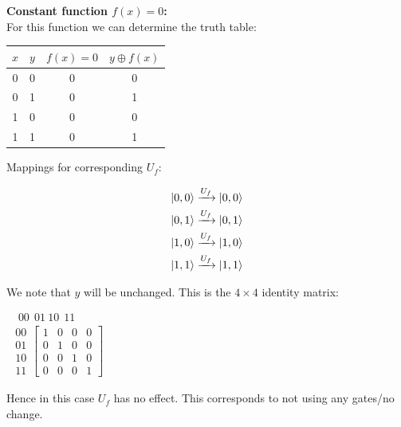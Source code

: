 \documentclass[conference]{IEEEtran}
\begin{document}
\begin{appendices}
\textbf{Constant function $f(x) = 0$:} \\

For this function we can determine the truth table:

\begin{center}
\begin{tabular}{|c|c|c|c|}
    \hline
    $x$ & $y$ & $f(x) = 0$ & $y \oplus f(x)$\\
    \hline
    0 & 0 & 0 & 0 \\
    0 & 1 & 0 & 1 \\
    1 & 0 & 0 & 0 \\
    1 & 1 & 0 & 1 \\
    \hline
\end{tabular}
\end{center}

Mappings for corresponding $U_f$:

\begin{gather*}
    \ket{0, 0} \xrightarrow{U_f} \ket{0, 0} \\
    \ket{0, 1} \xrightarrow{U_f} \ket{0, 1} \\
    \ket{1, 0} \xrightarrow{U_f} \ket{1, 0} \\
    \ket{1, 1} \xrightarrow{U_f} \ket{1, 1} \\
\end{gather*}

We note that $y$ will be unchanged. This is the $4 \times 4$ identity matrix:

\begin{center}
$
\begin{matrix}
    \ \ \ {\scriptstyle 00} \ \ {\scriptstyle 01} \ {\scriptstyle 10} \ \ {\scriptstyle 11}
    \\
    \begin{matrix}
    {\scriptstyle 00} \\
    {\scriptstyle 01} \\
    {\scriptstyle 10} \\
    {\scriptstyle 11}
    \end{matrix}
    \begin{bmatrix}
    1 & 0 & 0 & 0 \\
    0 & 1 & 0 & 0 \\
    0 & 0 & 1 & 0 \\
    0 & 0 & 0 & 1
    \end{bmatrix}
\end{matrix}
$
\end{center}

Hence in this case $U_f$ has no effect. This corresponds to not using any gates/no change.
 \ \\



\end{appendices}
\end{document}
